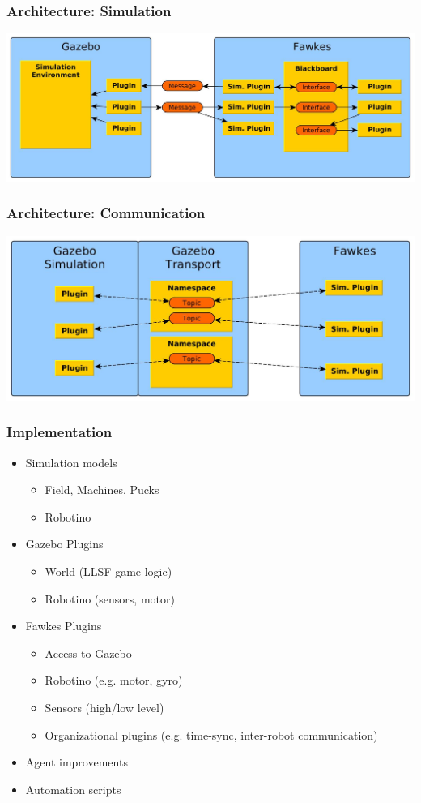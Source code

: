 \documentclass[]{beamer}
\begin{document}
\begin{frame}
  \frametitle{Architecture: Simulation}
  \includegraphics[width=\textwidth]{../tabs/fawkes_gazebo.jpg}
\end{frame}

\begin{frame}
  \frametitle{Architecture: Communication}
  \includegraphics[width=\textwidth]{../tabs/communication.jpg}
\end{frame}

\begin{frame}
  \frametitle{Implementation}
    \begin{itemize}
    \item Simulation models
      \begin{itemize}
      \item Field, Machines, Pucks
      \item Robotino
      \end{itemize}
    \item Gazebo Plugins
      \begin{itemize}
      \item World (LLSF game logic)
      \item Robotino (sensors, motor)
      \end{itemize}
    \item Fawkes Plugins
      \begin{itemize}
      \item Access to Gazebo
      \item Robotino (e.g. motor, gyro) 
      \item Sensors (high/low level)
      \item Organizational plugins (e.g. time-sync, inter-robot communication) %
      \end{itemize}
    \item Agent improvements
    \item Automation scripts
    \end{itemize}
\end{frame}
\end{document}
